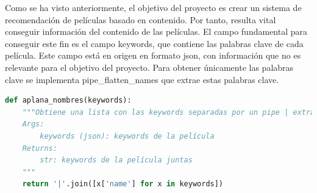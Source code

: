 Como se ha visto anteriormente, el objetivo del proyecto es crear un sistema de recomendación de películas basado en contenido. Por tanto, resulta vital conseguir información del contenido de las películas. El campo fundamental para conseguir este fin es el campo keywords, que contiene las palabras clave de cada película. Este campo está en origen en formato json, con información que no es relevante para el objetivo del proyecto. Para obtener únicamente las palabras clave se implementa pipe\_flatten\_names que extrae estas palabras clave.
\begin{lstlisting}[language=Python, caption= {Extracción de las palabras clave a partir del JSON del DataFrame. Cada JSON contiene más información además del valor de la keyword o el género. Se extraen todos los nombre y se devuelven como una cadena de texto.}]
def aplana_nombres(keywords):
    """Obtiene una lista con las keywords separadas por un pipe | extrayéndolas del json.
    Args:
        keywords (json): keywords de la película
    Returns:
        str: keywords de la película juntas
    """
    return '|'.join([x['name'] for x in keywords])
\end{lstlisting}

